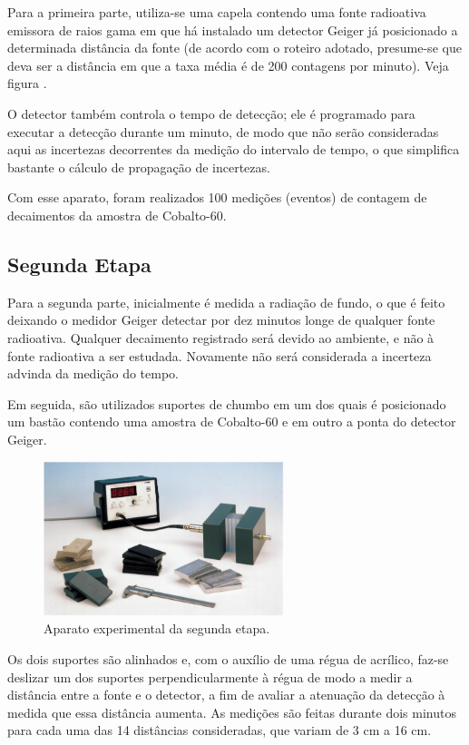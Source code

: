 \documentclass{article}
\begin{document}
Para a primeira parte, utiliza-se uma capela contendo uma fonte radioativa emissora de raios gama em que há instalado um detector Geiger já posicionado a determinada distância da fonte (de acordo com o roteiro adotado, presume-se que deva ser a distância em que a taxa média é de 200 contagens por minuto). Veja figura .

O detector também controla o tempo de detecção; ele é programado para executar a detecção durante um minuto, de modo que não serão consideradas aqui as incertezas decorrentes da medição do intervalo de tempo, o que simplifica bastante o cálculo de propagação de incertezas.

Com esse aparato, foram realizados 100 medições (eventos) de contagem de decaimentos da amostra de Cobalto-60.

\subsection{Segunda Etapa}

Para a segunda parte, inicialmente é medida a radiação de fundo, o que é feito deixando o medidor Geiger detectar por dez minutos longe de qualquer fonte radioativa. Qualquer decaimento registrado será devido ao ambiente, e não à fonte radioativa a ser estudada. Novamente não será considerada a incerteza advinda da medição do tempo.

Em seguida, são utilizados suportes de chumbo em um dos quais é posicionado um bastão contendo uma amostra de Cobalto-60 e em outro a ponta do detector Geiger.

\newpage

\begin{figure}
    \centering
    \includegraphics[width=7cm]{2etapa.png}
    \caption{Aparato experimental da segunda etapa.}
    \label{2etapa}
\end{figure}

Os dois suportes são alinhados e, com o auxílio de uma régua de acrílico, faz-se deslizar um dos suportes perpendicularmente à régua de modo a medir a distância entre a fonte e o detector, a fim de avaliar a atenuação da detecção à medida que essa distância aumenta. As medições são feitas durante dois minutos para cada uma das 14 distâncias consideradas, que variam de 3 cm a 16 cm.
\end{document}
